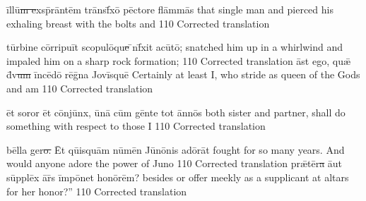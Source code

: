 \latline
  {\=ill\=u\sout{m e}xsp\={\macron{\i}}r\=ant\=em tr\={\macron a}nsf\={\macron{\i}}x\={\macron o} p\=ect\-or\-e fl\=amm\={\macron a}s}
  {that single man and pierced his exhaling breast with the bolts and  }
  {110} %
  {Corrected translation}
  {
  }

\latline
  {t\=urb\-in\-e c\=orr\-ip\-u\=it sc\-op\-ul\={\macron o}qu\sout{e }\={\macron{\i}}nf\={\macron{\i}}x\-it \-ac\={\macron u}t\={\macron o};}
  {snatched him up in a whirlwind and impaled him on a sharp rock formation;}
  {110} %
  {Corrected translation}
  {
  }
\newpage
\latline
  {\=ast \-eg\-o, qu\={\ae} d\={\macron{\i}}v\sout{um }\=inc\={\macron e}d\={\macron o} r\={\macron e}g\={\macron{\i}}n\-a J\-ov\=isqu\=e}
  {Certainly at least I, who stride as queen of the Gods and am }
  {110} %
  {Corrected translation}
  {
  }

\latline
  {\=et s\-or\-or \=et c\=onj\={\macron u}nx, \={\macron u}n\={\macron a} c\=um g\=ent\-e t\-ot \=ann\={\macron o}s}
  {both sister and partner, shall do something with respect to those I }
  {110} %
  {Corrected translation}
  {
  }

\latline
  {b\=ell\-a g\-er\sout{o.  }\=Et q\={ui}squ\=am n\={\macron u}m\=en J\={\macron u}n\={\macron o}n\-is \-ad\={\macron o}r\=at}
  {fought for so many years.  And would anyone adore the power of Juno}
  {110} %
  {Corrected translation}
  {
  }
\newpage
\latline
  {pr\={\ae}t\=er\sout{\macron a }\={au}t s\=uppl\=ex \={\macron a}r\={\macron{\i}}s \=imp\={\macron o}n\-et h\-on\={\macron o}r\=em?}
  {besides or offer meekly as a supplicant at altars for her honor?''}
  {110} %
  {Corrected translation}
  {
  }

